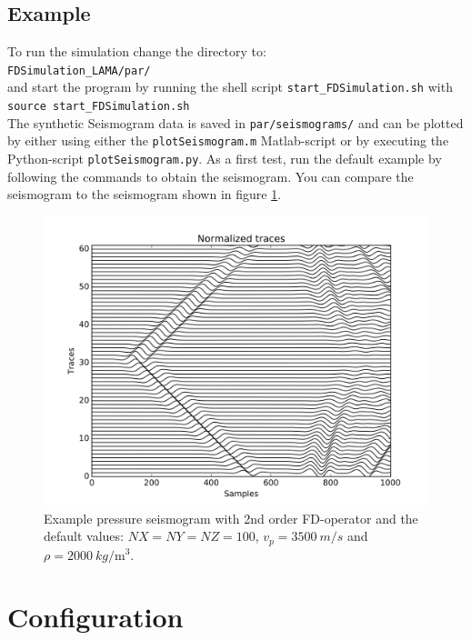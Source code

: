 \documentclass[pdftex,a4paper,parskip,listof=totoc,bibliography=totoc,onehalfspacing,12pt]{scrreprt}
\newcommand{\shellcmd}[1]{\indent\indent\texttt{#1}}	%
\newcommand{\shellcmdline}[1]{\indent\indent\texttt{\quad#1}} 	%
\begin{document}
\subsection{Example}

To run the simulation change the directory to: \\\shellcmdline{FDSimulation\_LAMA/par/}\\
and start the program by running the shell script \shellcmd{start\_FDSimulation.sh} with  \\\shellcmdline{source start\_FDSimulation.sh}\\

The synthetic Seismogram data is saved in \shellcmd{par/seismograms/} and can be plotted by either using either the \shellcmd{plotSeismogram.m} Matlab-script or by executing the Python-script \shellcmd{plotSeismogram.py}.
As a first test, run the default example by following the commands to obtain the seismogram. You can compare the seismogram to the seismogram shown in figure \ref{fig:Seismogram}.

\begin{figure}[h!]
\centering
	\includegraphics[width = .8\textwidth]{images/Test_Seismogram.png}
	\caption[Example pressure seismogram.]{Example pressure seismogram with 2nd order FD-operator and the default values: $NX=NY=NZ=100$, $v_p=\SI{3500}{m\per s}$ and $\rho = \SI{2000}{kg\per\cubic\metre}$.}\label{fig:Seismogram}
\end{figure}

\section{Configuration}\label{sec:config}
\end{document}
